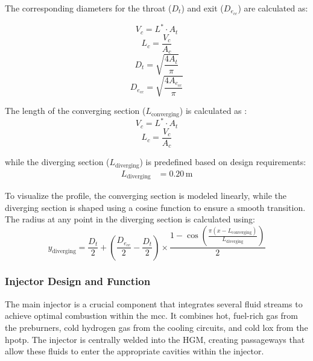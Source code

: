 The corresponding diameters for the throat (\( D_t \)) and exit (\( D_{e_{cc}} \)) are calculated as:

\begin{equation} V_c = L^* \cdot A_t
            \end{equation}
            \begin{equation}
            L_c = \frac{V_c}{A_c}\end{equation}
\begin{equation}
D_t = \sqrt{\frac{4 A_t}{\pi}}
\end{equation}
\begin{equation}
D_{e_{cc}} = \sqrt{\frac{4 A_{e_{cc}}}{\pi}}
\end{equation}

The length of the converging section (\( L_{\text{converging}} \)) is calculated as :
\begin{equation} V_c = L^* \cdot A_t
            \end{equation}
            \begin{equation}
 L_c = \frac{V_c}{A_c}\end{equation}

while the diverging section (\( L_{\text{diverging}} \)) is predefined based on design requirements:
\begin{align}
L_{\text{diverging}} &= 0.20 \, \text{m}
\end{align}

To visualize the profile, the converging section is modeled linearly, while the diverging section is shaped using a cosine function to ensure a smooth transition. The radius at any point in the diverging section is calculated using:
\begin{equation}
y_{\text{diverging}} = \frac{D_t}{2} + \left(\frac{D_{e_{cc}}}{2} - \frac{D_t}{2}\right) \times \frac{1 - \cos\left(\frac{\pi (x - L_{\text{converging}})}{L_{\text{diverging}}}\right)}{2}
\end{equation}




\subsubsection{Injector Design and Function}
The main injector is a crucial component that integrates several fluid streams to achieve optimal combustion within the \acrfull{mcc}. It combines hot, fuel-rich gas from the preburners, cold hydrogen gas from the cooling circuits, and cold \acrlong{lox} from the \acrfull{hpotp}. The injector is centrally welded into the \acrfull{HGM}, creating passageways that allow these fluids to enter the appropriate cavities within the injector.

